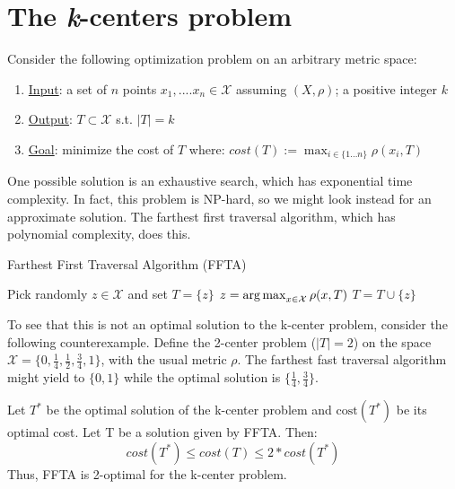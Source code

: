 \section{The \emph{k}-centers problem}
Consider the following optimization problem on an arbitrary metric
space:
\begin{enumerate}
\item \underline{Input}: a set of $n$ points $x_1,....x_n \in 
\mathcal{X}$ assuming $(X,\rho)$; a positive integer $k$ 
\item \underline{Output}: $T \subset \mathcal{X}$ s.t. $|T| = k$
\item \underline{Goal}: minimize the cost of $T$ where: $ cost(T)
:= \max_{i \in \{1...n\}} \rho(x_i,T) $
\end{enumerate}

One possible solution is an exhaustive search, which has exponential
time complexity. In fact, this problem is NP-hard, so we might look
instead for an approximate solution. The farthest first traversal
algorithm, which has polynomial complexity, does this.

\begin{algorithm}
\caption{Farthest First Traversal Algorithm (FFTA)}
\begin{algorithmic} 
\STATE Pick randomly $z\in \mathcal{X}$ and set $T = \{z\}$\;
\STATE $z = \operatorname*{\mathrm{arg\,max}}_{x\in \mathcal{X}} \rho(x,T)$ \;
\STATE $T = T \cup \{z\}$\;
\ENDWHILE
\end{algorithmic}
\end{algorithm}

\begin{example}
To see that this is not an optimal solution to the k-center problem,
consider the following counterexample. Define the 2-center problem
($|T| = 2$) on the space $\mathcal{X} = \{0, \frac{1}{4}, \frac{1}{2},
\frac{3}{4}, 1\}$, with the usual metric $\rho$. The farthest fast
traversal algorithm might yield to  $\{0,1\}$ while the optimal
solution is $\{\frac{1}{4},\frac{3}{4}\}$.
\end{example}

\begin{theorem}
Let $T^*$ be the optimal solution of the k-center problem and
$\mathrm{cost}(T^*)$ be its optimal cost. Let T be a solution given
by FFTA. Then: 
\[cost(T^*) \le cost(T) \le 2 * cost(T^*)\]
Thus, FFTA is 2-optimal for the k-center problem. 
\end{theorem} 

